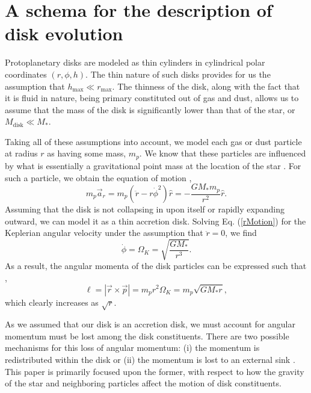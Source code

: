 \documentclass[aps,pra,twocolumn]{revtex4-1}
\begin{document}
\section{\label{section 2} A schema for the description of disk evolution}

Protoplanetary disks are modeled as thin cylinders in cylindrical polar coordinates $(r, \phi, h)$.  The thin nature of such disks provides for us the assumption that $h_{\text{max}} \ll r_{\text{max}}$.  The thinness of the disk, along with the fact that it is fluid in nature, being primary constituted out of gas and dust, allows us to assume that the mass of the disk is significantly lower than that of the star, or $M_{\text{disk}} \ll M_{*}$.  

Taking all of these assumptions into account, we model each gas or dust particle at radius $r$ as having some mass, $m_p$.  We know that these particles are influenced by what is essentially a gravitational point mass at the location of the star \cite{armitage2011}.  For such a particle, we obtain the equation of motion \cite{taylor2005},
\begin{equation}
m_p \vec{a}_r = m_p ( \ddot{r} - r\dot{\phi}^2 )\hat{r} = - \frac{G M_* m_p}{r^2}\hat{r} . \label{rMotion}
\end{equation}
Assuming that the disk is not collapsing in upon itself or rapidly expanding outward, we can model it as a thin accretion disk.  Solving Eq. (\ref{rMotion}) for the Keplerian angular velocity under the assumption that $\ddot{r} = 0$, we find \cite{armitage2011}
\begin{equation}
\dot{\phi} = \Omega_K = \sqrt{\frac{G M_*}{r^3}}.
\end{equation}
As a result, the angular momenta of the disk particles can be expressed such that \cite{taylor2005},
\begin{equation}
\ell = \left| \vec{r} \times \vec{p} \right| = m_p r^2 \Omega_K = m_p \sqrt{G M_* r},
\end{equation}
which clearly increases as $\sqrt{r}$.  

As we assumed that our disk is an accretion disk, we must account for angular momentum must be lost among the disk constituents.  There are two possible mechanisms for this loss of angular momentum: (i) the momentum is redistributed within the disk or (ii) the momentum is lost to an external sink \cite{armitage2011}.  This paper is primarily focused upon the former, with respect to how the gravity of the star and neighboring particles affect the motion of disk constituents.
\end{document}
